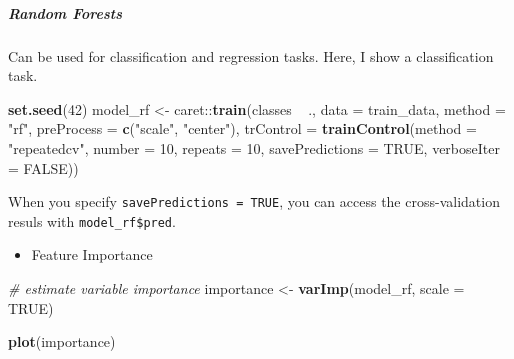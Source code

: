 \documentclass[]{article}
\newenvironment{Shaded}{\begin{snugshade}}{\end{snugshade}}
\newcommand{\KeywordTok}[1]{\textcolor[rgb]{0.13,0.29,0.53}{\textbf{{#1}}}}
\newcommand{\DataTypeTok}[1]{\textcolor[rgb]{0.13,0.29,0.53}{{#1}}}
\newcommand{\DecValTok}[1]{\textcolor[rgb]{0.00,0.00,0.81}{{#1}}}
\newcommand{\StringTok}[1]{\textcolor[rgb]{0.31,0.60,0.02}{{#1}}}
\newcommand{\CommentTok}[1]{\textcolor[rgb]{0.56,0.35,0.01}{\textit{{#1}}}}
\newcommand{\OtherTok}[1]{\textcolor[rgb]{0.56,0.35,0.01}{{#1}}}
\newcommand{\NormalTok}[1]{{#1}}
\providecommand{\tightlist}{%
  \setlength{\itemsep}{0pt}\setlength{\parskip}{0pt}}
\let\oldsubparagraph\subparagraph
\renewcommand{\subparagraph}[1]{\oldsubparagraph{#1}\mbox{}}
\begin{document}
\subparagraph{Random Forests}\label{random-forests}

Can be used for classification and regression tasks. Here, I show a
classification task.

\begin{Shaded}
\begin{Highlighting}[]
\KeywordTok{set.seed}\NormalTok{(}\DecValTok{42}\NormalTok{)}
\NormalTok{model_rf <-}\StringTok{ }\NormalTok{caret::}\KeywordTok{train}\NormalTok{(classes ~}\StringTok{ }\NormalTok{.,}
                         \DataTypeTok{data =} \NormalTok{train_data,}
                         \DataTypeTok{method =} \StringTok{"rf"}\NormalTok{,}
                         \DataTypeTok{preProcess =} \KeywordTok{c}\NormalTok{(}\StringTok{"scale"}\NormalTok{, }\StringTok{"center"}\NormalTok{),}
                         \DataTypeTok{trControl =} \KeywordTok{trainControl}\NormalTok{(}\DataTypeTok{method =} \StringTok{"repeatedcv"}\NormalTok{, }
                                                  \DataTypeTok{number =} \DecValTok{10}\NormalTok{, }
                                                  \DataTypeTok{repeats =} \DecValTok{10}\NormalTok{, }
                                                  \DataTypeTok{savePredictions =} \OtherTok{TRUE}\NormalTok{, }
                                                  \DataTypeTok{verboseIter =} \OtherTok{FALSE}\NormalTok{))}
\end{Highlighting}
\end{Shaded}

When you specify \texttt{savePredictions\ =\ TRUE}, you can access the
cross-validation resuls with \texttt{model\_rf\$pred}.

\begin{itemize}
\tightlist
\item
  Feature Importance
\end{itemize}

\begin{Shaded}
\begin{Highlighting}[]
\CommentTok{# estimate variable importance}
\NormalTok{importance <-}\StringTok{ }\KeywordTok{varImp}\NormalTok{(model_rf, }\DataTypeTok{scale =} \OtherTok{TRUE}\NormalTok{)}

\KeywordTok{plot}\NormalTok{(importance)}
\end{Highlighting}
\end{Shaded}
\end{document}
